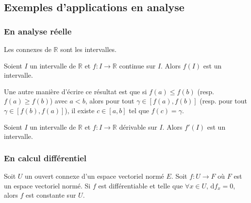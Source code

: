   \subsection{Exemples d'applications en analyse}

  \subsubsection{En analyse réelle}


  \begin{theorem}
    Les connexes de $\mathbb{R}$ sont les intervalles.
  \end{theorem}

  \begin{theorem}
    Soient $I$ un intervalle de $\mathbb{R}$ et $f : I \rightarrow \mathbb{R}$ continue sur $I$. Alors $f(I)$ est un intervalle.
  \end{theorem}

  \begin{remark}
    Une autre manière d'écrire ce résultat est que si $f(a) \leq f(b)$ (resp. $f(a) \geq f(b)$) avec $a<b$, alors pour tout $\gamma \in [f(a),f(b)]$ (resp. pour tout $\gamma \in [f(b),f(a)]$), il existe $c \in [a,b]$ tel que $f(c) = \gamma$.
  \end{remark}


  \begin{corollary}
    Soient $I$ un intervalle de $\mathbb{R}$ et $f : I \rightarrow \mathbb{R}$ dérivable sur $I$. Alors $f'(I)$ est un intervalle.
  \end{corollary}

  \subsubsection{En calcul différentiel}


  \begin{proposition}
    Soit $U$ un ouvert connexe d'un espace vectoriel normé $E$. Soit $f : U \rightarrow F$ où $F$ est un espace vectoriel normé. Si $f$ est différentiable et telle que $\forall x \in U, \, \mathrm{d}f_x = 0$, alors $f$ est constante sur $U$.
  \end{proposition}


